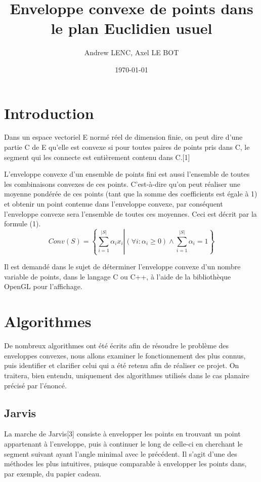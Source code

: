\documentclass[final]{beamer}
\title
[Des enveloppes convexes, 2017-2018, Dijon, France] %
{ %
Enveloppe convexe de points dans le plan Euclidien usuel
}
\author{ %
Andrew LENC, Axel LE BOT
}
\institute
[Université de Bourgogne] %
{
ESIREM, France\\[0.3ex]
}
\date{\today}
\begin{document}
\begin{frame}[t]
\begin{multicols}{3}

\section{Introduction}

Dans un espace vectoriel E normé réel de dimension finie, on peut dire d'une partie C de E qu'elle est convexe si pour toutes paires de points pris dans C, le segment qui les connecte est entièrement contenu dans C.[1]

L'enveloppe convexe d'un ensemble de points fini est aussi l'ensemble de toutes les combinaisons convexes de ces points. C'est-à-dire qu'on peut réaliser une moyenne pondérée de ces points (tant que la somme des coefficients est égale à 1) et obtenir un point contenue dans l'enveloppe convexe, par conséquent l'enveloppe convexe sera l'ensemble de toutes ces moyennes. Ceci est décrit par la formule (1).
\begin{equation}
Conv(S) = \left \{  \sum_{i=1}^{|S|} \alpha_{i}x_{i} \left | (\forall i : \alpha_{i} \geqslant 0) \wedge  \sum_{i=1}^{|S|} \alpha_{i} = 1 \right \}
\end{equation}

Il est demandé dans le sujet de déterminer l'enveloppe convexe d'un nombre variable de points, dans le langage C ou C++, à l'aide de la bibliothèque OpenGL pour l'affichage.

\section{Algorithmes}

De nombreux algorithmes ont été écrits afin de résoudre le problème des enveloppes convexes, nous allons examiner le fonctionnement des plus connus, puis identifier et clarifier celui qui a été retenu afin de réaliser ce projet. On traitera, bien entendu, uniquement des algorithmes utilisés dans le cas planaire précisé par l'énoncé.
\subsection{Jarvis}
La marche de Jarvis[3] consiste à envelopper les points en trouvant un point appartenant à l'enveloppe, puis à continuer le long de celle-ci en cherchant le segment suivant ayant l'angle minimal avec le précédent. Il s'agit d'une des méthodes les plus intuitives, puisque comparable à envelopper les points dans, par exemple, du papier cadeau.


\end{multicols}
\end{frame}
\end{document}
